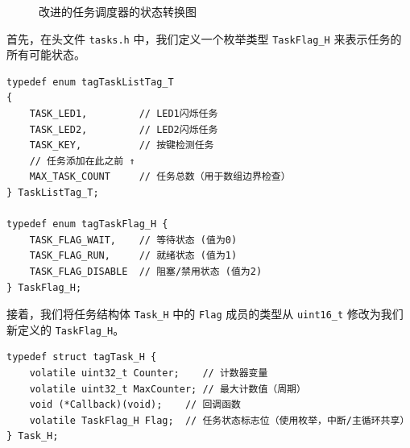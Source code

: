 \begin{figure}[htbp]
\centering
\caption{改进的任务调度器的状态转换图} \label{fig:sched-v1}
\end{figure}

首先，在头文件 \texttt{tasks.h} 中，我们定义一个枚举类型 \texttt{TaskFlag\_H} 来表示任务的所有可能状态。

\begin{lstlisting}[style=c]
typedef enum tagTaskListTag_T
{
    TASK_LED1,         // LED1闪烁任务
    TASK_LED2,         // LED2闪烁任务
    TASK_KEY,          // 按键检测任务
    // 任务添加在此之前 ↑
    MAX_TASK_COUNT     // 任务总数（用于数组边界检查）
} TaskListTag_T;

typedef enum tagTaskFlag_H {
    TASK_FLAG_WAIT,    // 等待状态 (值为0)
    TASK_FLAG_RUN,     // 就绪状态 (值为1)
    TASK_FLAG_DISABLE  // 阻塞/禁用状态 (值为2)
} TaskFlag_H;
\end{lstlisting}

接着，我们将任务结构体 \texttt{Task\_H} 中的 \texttt{Flag} 成员的类型从 \texttt{uint16\_t} 修改为我们新定义的 \texttt{TaskFlag\_H}。

\begin{lstlisting}[style=c]
typedef struct tagTask_H {
    volatile uint32_t Counter;    // 计数器变量
    volatile uint32_t MaxCounter; // 最大计数值（周期）
    void (*Callback)(void);    // 回调函数
    volatile TaskFlag_H Flag;  // 任务状态标志位（使用枚举，中断/主循环共享）
} Task_H;
\end{lstlisting}

